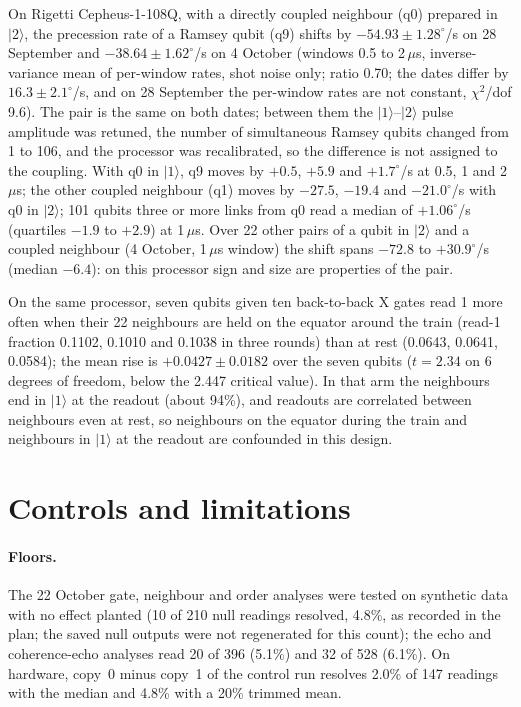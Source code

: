 \documentclass[reprint,amsmath,amssymb,aps,superscriptaddress,nofootinbib]{revtex4-2}
\newcommand{\us}{\,$\mu$s}
\begin{document}
On Rigetti Cepheus-1-108Q, with a directly coupled neighbour (q0) prepared in $|2\rangle$, the precession rate of a Ramsey qubit (q9) shifts by $-54.93\pm1.28^\circ$/\textmu s on 28 September and $-38.64\pm1.62^\circ$/\textmu s on 4 October (windows 0.5 to 2\us, inverse-variance mean of per-window rates, shot noise only; ratio 0.70; the dates differ by $16.3\pm2.1^\circ$/\textmu s, and on 28 September the per-window rates are not constant, $\chi^2$/dof 9.6). The pair is the same on both dates; between them the $|1\rangle$--$|2\rangle$ pulse amplitude was retuned, the number of simultaneous Ramsey qubits changed from 1 to 106, and the processor was recalibrated, so the difference is not assigned to the coupling. With q0 in $|1\rangle$, q9 moves by $+0.5$, $+5.9$ and $+1.7^\circ$/\textmu s at 0.5, 1 and 2\us; the other coupled neighbour (q1) moves by $-27.5$, $-19.4$ and $-21.0^\circ$/\textmu s with q0 in $|2\rangle$; 101 qubits three or more links from q0 read a median of $+1.06^\circ$/\textmu s (quartiles $-1.9$ to $+2.9$) at 1\us. Over 22 other pairs of a qubit in $|2\rangle$ and a coupled neighbour (4 October, 1\us{} window) the shift spans $-72.8$ to $+30.9^\circ$/\textmu s (median $-6.4$): on this processor sign and size are properties of the pair.

On the same processor, seven qubits given ten back-to-back X gates read 1 more often when their 22 neighbours are held on the equator around the train (read-1 fraction 0.1102, 0.1010 and 0.1038 in three rounds) than at rest (0.0643, 0.0641, 0.0584); the mean rise is $+0.0427\pm0.0182$ over the seven qubits ($t=2.34$ on 6 degrees of freedom, below the 2.447 critical value). In that arm the neighbours end in $|1\rangle$ at the readout (about 94\%), and readouts are correlated between neighbours even at rest, so neighbours on the equator during the train and neighbours in $|1\rangle$ at the readout are confounded in this design.

\section{Controls and limitations}\label{sec:controls}

\paragraph*{Floors.} The 22 October gate, neighbour and order analyses were tested on synthetic data with no effect planted (10 of 210 null readings resolved, 4.8\%, as recorded in the plan; the saved null outputs were not regenerated for this count); the echo and coherence-echo analyses read 20 of 396 (5.1\%) and 32 of 528 (6.1\%). On hardware, copy~0 minus copy~1 of the control run resolves 2.0\% of 147 readings with the median and 4.8\% with a 20\% trimmed mean.
\end{document}
